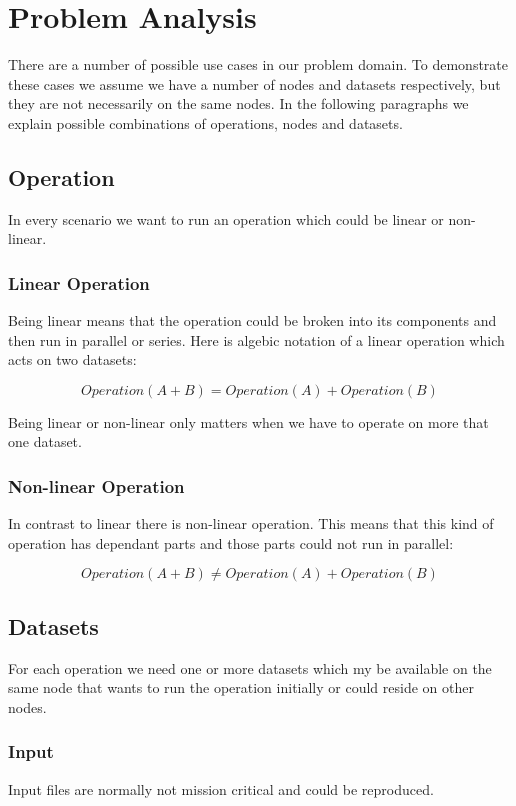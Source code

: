 \chapter{Problem Analysis}
\label{cha:analysis}

There are a number of possible use cases in our problem domain. To demonstrate these cases we assume
we have a number of nodes and datasets respectively, but they are not necessarily on the same nodes.
In the following paragraphs we explain possible combinations of operations, nodes and datasets.

\section{Operation}
In every scenario we want to run an operation which could be linear or non-linear.

\subsection{Linear Operation}
Being linear means that the operation
could be broken into its components and then run in parallel or series. Here is algebic notation
of a linear operation which acts on two datasets:

\[ Operation(A + B) = Operation(A) + Operation(B) \]

Being linear or non-linear only matters when we have to operate on more that one dataset.

\subsection{Non-linear Operation}
In contrast to linear there is non-linear operation. This means that this kind of operation has dependant parts and
those parts could not run in parallel:

\[ Operation(A + B) \neq Operation(A) + Operation(B) \]

\section{Datasets}
For each operation we need one or more datasets which my be available on the same node that wants to run the operation
initially or could reside on other nodes. 

\subsection{Input}
Input files are normally not mission critical and could be reproduced.

